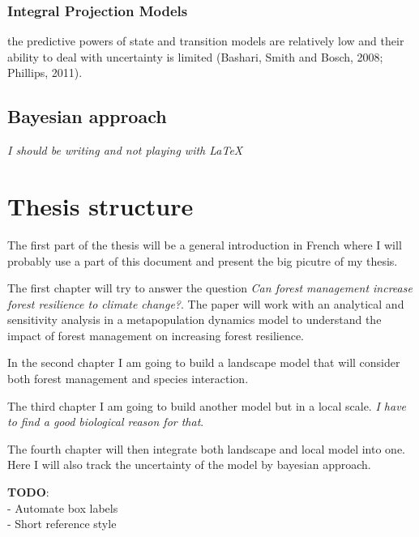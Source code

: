 \subsubsection{Integral Projection Models}

the predictive powers of state and transition models are relatively low and their ability to deal with uncertainty is limited (Bashari, Smith and Bosch, 2008; Phillips, 2011).

\subsection{Bayesian approach}

\textit{I should be writing and not playing with \LaTeX}

\section{Thesis structure}

The first part of the thesis will be a general introduction in French where  I will probably use a part of this document and present the big picutre of my thesis.

The first chapter will try to answer the question \textit{Can forest management increase forest resilience to climate change?}. The paper will work with an analytical and sensitivity analysis in a metapopulation dynamics model to understand the impact of forest management on increasing forest resilience.

In the second chapter I am going to build a landscape model that will consider both forest management and species interaction.

The third chapter I am going to build another model but in a local scale. \textit{I have to find a good biological reason for that}.

The fourth chapter will then integrate both landscape and local model into one. Here I will also track the uncertainty of the model by bayesian approach.

\textbf{TODO}: \\
- Automate box labels \\
- Short reference style \\

\clearpage



